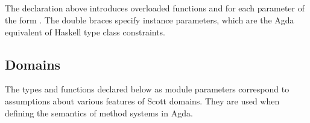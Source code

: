 \begin{AgdaAlign}
\begin{code}
\>[2]\AgdaSpace{}%
\AgdaSymbol{(}\AgdaSymbol{;}\AgdaSpace{}%
\AgdaOperator{\AgdaInductiveConstructor{\AgdaUnderscore{},\AgdaUnderscore{}}}\AgdaSymbol{;}\AgdaSpace{}%
\AgdaSymbol{;}\AgdaSpace{}%
\AgdaSymbol{)}%
\>[34]\<%
\\
\>[0]\AgdaSpace{}%
\AgdaSpace{}%
\<%
\\
\>[0][@{}l@{\AgdaIndent{0}}]%
\>[2]\AgdaSpace{}%
\AgdaSymbol{(}\AgdaSymbol{;}\AgdaSpace{}%
\AgdaSymbol{;}\AgdaSpace{}%
\AgdaSymbol{)}%
\>[34]\<%
\\
\>[0]\AgdaSpace{}%
\AgdaSpace{}%
\AgdaSymbol{\{\{}\AgdaSpace{}%
\AgdaSpace{}%
\AgdaSymbol{\}\}}\<%
\\
\>[0][@{}l@{\AgdaIndent{0}}]%
\>[2]\AgdaSpace{}%
\AgdaSymbol{(}\AgdaSymbol{;}\AgdaSpace{}%
\AgdaSymbol{)}%
\>[34]\<%
\end{code}
%
The declaration  above introduces overloaded functions
 and  for each parameter of the form .
The double braces specify instance parameters,
which are the Agda equivalent of Haskell type class constraints.

\subsection{Domains}

The types and functions declared below as module parameters
correspond to assumptions about various features of Scott domains.
They are used when defining the semantics of method systems in Agda.


\end{AgdaAlign}
